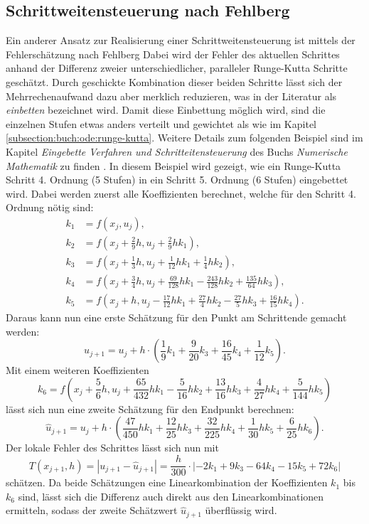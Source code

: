 \subsection{Schrittweitensteuerung nach Fehlberg
  \label{steps:subsection:fehlberg}}
Ein anderer Ansatz zur Realisierung einer Schrittweitensteuerung ist mittels der Fehlerschätzung nach Fehlberg
Dabei wird der Fehler des aktuellen Schrittes anhand der Differenz zweier unterschiedlicher, paralleler
Runge-Kutta Schritte geschätzt. Durch geschickte Kombination dieser beiden Schritte
lässt sich der Mehrrechenaufwand dazu aber merklich reduzieren, was in der Literatur als \textit{einbetten} bezeichnet wird.
Damit diese Einbettung möglich wird, sind die einzelnen Stufen etwas anders verteilt und gewichtet als wie im Kapitel
\ref{subsection:buch:ode:runge-kutta}. Weitere Details zum folgenden Beispiel sind im Kapitel \textit{Eingebette Verfahren und Schritteitensteuerung}
des Buchs \textit{Numerische Mathematik} zu finden
\cite{steps:Numerische-Mathematik}.
In diesem Beispiel wird gezeigt, wie ein Runge-Kutta Schritt 4. Ordnung (5 Stufen) in ein Schritt 5. Ordnung (6 Stufen) eingebettet wird.
Dabei werden zuerst alle Koeffizienten berechnet, welche für den Schritt 4. Ordnung nötig sind:
\begin{align*}
  k_1 & =f(x_j, u_j),                                                                           \\
  k_2 & =f\left(x_j + \frac{2}{9}h, u_j+\frac{2}{9}hk_1\right),                                            \\
  k_3 & =f\left(x_j + \frac{1}{3}h, u_j+\frac{1}{12}hk_1+\frac{1}{4}hk_2\right),                           \\
  k_4 & =f\left(x_j + \frac{3}{4}h, u_j+\frac{69}{128}hk_1-\frac{243}{128}hk_2+\frac{135}{64}hk_3\right),  \\
  k_5 & =f\left(x_j + h, u_j-\frac{17}{12}hk_1+\frac{27}{4}hk_2-\frac{27}{5}hk_3+\frac{16}{15}hk_4\right).
\end{align*}
Daraus kann nun eine erste Schätzung für den Punkt am Schrittende gemacht werden:
\[
  u_{j+1} =u_j +h\cdot\left(\frac{1}{9}k_1+\frac{9}{20}k_3+\frac{16}{45}k_4+\frac{1}{12}k_5\right).
\]
Mit einem weiteren Koeffizienten
\[
  k_6 =f\left(x_j + \frac{5}{6}h, u_j+\frac{65}{432}hk_1-\frac{5}{16}hk_2+\frac{13}{16}hk_3+\frac{4}{27}hk_4+\frac{5}{144}hk_5\right)
\]
lässt sich nun eine zweite Schätzung für den Endpunkt berechnen:
\[
  \hat{u}_{j+1} =u_j+h\cdot\left(\frac{47}{450}hk_1+\frac{12}{25}hk_3+\frac{32}{225}hk_4+\frac{1}{30}hk_5+\frac{6}{25}hk_6\right).
\]
Der lokale Fehler des Schrittes lässt sich nun mit
\[
  T(x_{j+1},h)=|u_{j+1}-\hat{u}_{j+1}|=\frac{h}{300}\cdot|-2k_1+9k_3-64k_4-15k_5+72k_6|
\]
schätzen.
Da beide Schätzungen eine Linearkombination der Koeffizienten $k_1$ bis $k_6$ sind,
lässt sich die Differenz auch direkt aus den Linearkombinationen ermitteln,
sodass der zweite Schätzwert $\hat{u}_{j+1}$ überflüssig wird.


